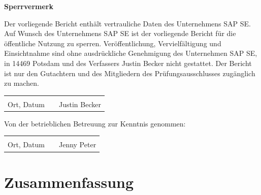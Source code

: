 \documentclass[
	12pt, %
	a4paper,
	bibliography=totoc, %
	numbers=noenddot, %
	ngerman, %
	headsepline, %
	oneside %
	]{scrbook} %
\newcommand{\studentName}{Justin Becker}
\newcommand{\betreuerUnt}{Jenny Peter}
\begin{document}
\maketitle

\onehalfspacing

\textbf{Sperrvermerk}

Der vorliegende Bericht enthält vertrauliche Daten des Unternehmens SAP SE.
Auf Wunsch des Unternehmens SAP SE ist der vorliegende Bericht für die öffentliche Nutzung zu sperren.
Veröffentlichung, Vervielfältigung und Einsichtnahme sind ohne ausdrückliche Genehmigung des Unternehmen SAP SE, in 14469 Potsdam und des Verfassers Justin Becker nicht gestattet.
Der Bericht ist nur den Gutachtern und des Mitgliedern des Prüfungsausschlusses zugänglich zu machen.

\vspace{20mm}

\begin{tabular}{lp{2em}l} 
    \hspace{4cm}   && \hspace{4cm} \\\cline{1-1}\cline{3-3} 
    Ort, Datum     && \studentName{}
\end{tabular}

\vspace{\fill}
\normalsize{Von der betrieblichen Betreuung zur Kenntnis genommen:}
\vspace*{20mm}

\begin{tabular}{lp{2em}l} 
    \hspace{4cm}   && \hspace{4cm} \\\cline{1-1}\cline{3-3} 
    Ort, Datum     && \betreuerUnt
\end{tabular}



\chapter*{Zusammenfassung}


\end{document}
